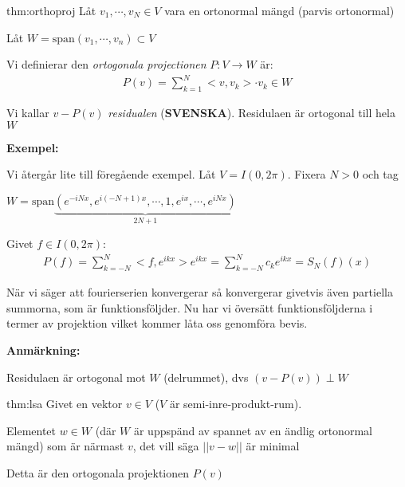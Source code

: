 \par\bigskip
\begin{theo}{thm:orthoproj}
  Låt $v_1,\cdots,v_N\in V$ vara en ortonormal mängd (parvis ortonormal)\par
  \noindent Låt $W = \text{span}(v_1,\cdots,v_n)\subset V$
  \par\bigskip
  \noindent Vi definierar den \textit{ortogonala projectionen} $P:V\to W$ är:
  \begin{equation*}
    \begin{gathered}
      P(v) = \sum_{k=1}^{N}<v,v_k>\cdot v_k\in W
    \end{gathered}
  \end{equation*}
  \par\bigskip
  \noindent Vi kallar $v-P(v)$ \textit{residualen} (\textbf{SVENSKA}). Residulaen är ortogonal till hela $W$
\end{theo}
\newpage
\noindent\textbf{Exempel:}\par
\noindent Vi återgår lite till föregående exempel. Låt $V = I(0,2\pi)$. Fixera $N>0$ och tag \par
$W = \text{span}\underbrace{(e^{-iNx},e^{i(-N+1)x},\cdots,1,e^{ix},\cdots,e^{iNx})}_{\text{$2N+1$}}$
\par\bigskip
\noindent Givet $f\in I(0,2\pi)$:
\begin{equation*}
  \begin{gathered}
    P(f) = \sum_{k=-N}^{N}<f,e^{ikx}>e^{ikx} = \sum_{k=-N}^{N}c_ke^{ikx} = S_N(f)(x)
  \end{gathered}
\end{equation*}
\par\bigskip
\noindent När vi säger att fourierserien konvergerar så konvergerar givetvis även partiella summorna, som är funktionsföljder. Nu har vi översätt funktionsföljderna i termer av projektion vilket kommer låta oss genomföra bevis.
\par\bigskip
\noindent\textbf{Anmärkning:}\par
\noindent Residulaen är ortogonal mot $W$ (delrummet), dvs $(v-P(v))\perp W$
\par\bigskip
\begin{theo}{thm:lsa}
  Givet en vektor $v\in V$ ($V$ är semi-inre-produkt-rum).\par
  \noindent Elementet $w\in W$ (där $W$ är uppspänd av spannet av en ändlig ortonormal mängd) som är närmast $v$, det vill säga $\left|\left|v-w\right|\right|$ är minimal
  \par\bigskip
  \noindent Detta är den ortogonala projektionen $P(v)$
\end{theo}
